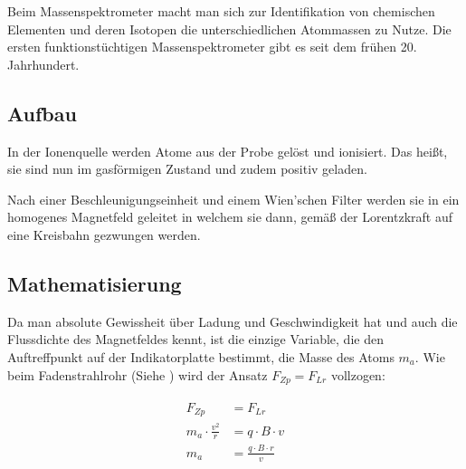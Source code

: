 Beim Massenspektrometer macht man sich zur Identifikation von chemischen Elementen und deren Isotopen die unterschiedlichen Atommassen zu Nutze. Die ersten funktionstüchtigen Massenspektrometer gibt es seit dem frühen 20. Jahrhundert.

\subsection{Aufbau}

In der Ionenquelle werden Atome aus der Probe gelöst und ionisiert. Das heißt, sie sind nun im gasförmigen Zustand und zudem positiv geladen.

Nach einer Beschleunigungseinheit und einem Wien'schen Filter werden sie in ein homogenes Magnetfeld geleitet in welchem sie dann, gemäß der Lorentzkraft auf eine Kreisbahn gezwungen werden. 

\subsection{Mathematisierung}

Da man absolute Gewissheit über Ladung und Geschwindigkeit hat und auch die Flussdichte des Magnetfeldes kennt, ist die einzige Variable, die den Auftreffpunkt auf der Indikatorplatte bestimmt, die Masse des Atoms $m_a$. Wie beim Fadenstrahlrohr (Siehe ) wird der Ansatz $F_{Zp} = F_{Lr}$ vollzogen:

\begin{align}
\begin{split}
	F_{Zp} 				  	&= F_{Lr} \\
	m_a \cdot \frac{v^2}{r} &= q \cdot B \cdot v \\
	m_a 					&= \frac{q \cdot B \cdot r}{v}
\end{split}
\end{align}










